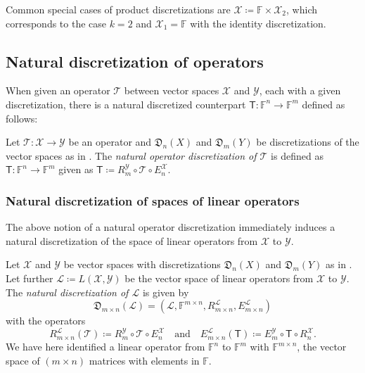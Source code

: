 \documentclass[a4paper]{paper}
\newcommand*{\SPC}[1]{{\ensuremath{\mathscr{#1}}}}
\newcommand*{\SPCL}{\SPC{L}}
\newcommand*{\SPCX}{\SPC{X}}
\newcommand*{\SPCY}{\SPC{Y}}
\newcommand*{\LINOP}[2]{{L(#1, #2)}}
\newcommand{\FIELD}{{\ensuremath{\mathbb{F}}}}
\newcommand*{\Fn}{{\ensuremath{\FIELD^n}}}
\newcommand*{\Fm}{{\ensuremath{\FIELD^m}}}
\newcommand*{\Fmxn}{{\ensuremath{\FIELD^{m \times n}}}}
\newcommand*{\OP}[1]{{\ensuremath{\mathcal{#1}}}}
\newcommand*{\OPT}{\OP{T}}
\newcommand{\DISCOP}[1]{{\ensuremath{\mathsf{#1}}}}
\newcommand*{\DISCOPT}{\DISCOP{T}}
\newcommand*{\EXT}[2]{\ensuremath{E_{#1}^{#2}}}
\newcommand*{\REST}[2]{\ensuremath{R_{#1}^{#2}}}
\newcommand*{\RnX}{{\ensuremath{\REST{n}{\SPC{X}}}}}
\newcommand*{\RmY}{{\ensuremath{\REST{m}{\SPC{Y}}}}}
\newcommand*{\EnX}{{\ensuremath{\EXT{n}{\SPC{X}}}}}
\newcommand*{\EmY}{{\ensuremath{\EXT{m}{\SPC{Y}}}}}
\newcommand*{\DISCR}[2]{{\ensuremath{\mathfrak{D}_{#2}(#1)}}}
\newcommand*{\DISCRnX}{\DISCR{X}{n}}
\newcommand*{\DISCRmY}{\DISCR{Y}{m}}
\begin{document}
%
Common special cases of product discretizations are $\SPCX\coloneqq \FIELD \times \SPCX_2$, which corresponds to the 
case 
$k=2$ and $\SPCX_1=\FIELD$ with the identity discretization.



\subsection{Natural discretization of operators}
\label{subsec:discr:operator}

When given an operator $\OPT$ between vector spaces $\SPCX$ and $\SPCY$, each with a given discretization, 
there is a natural discretized counterpart $\DISCOPT \colon \Fn \to \Fm$ defined as follows:

\begin{definition}
 \label{def:discr:operator:operator_discr}
 Let $\OPT\colon \SPCX \to \SPCY$ be an operator and $\DISCRnX$ and $\DISCRmY$ be 
 discretizations of the vector spaces as in . The 
 \emph{natural operator discretization of $\OPT$} is defined as $\DISCOPT \colon \Fn \to \Fm$ given as 
 $\DISCOPT \coloneqq  \RmY \circ \OPT \circ \EnX$.
\end{definition}


\subsubsection{Natural discretization of spaces of linear operators}
\label{subsubsec:discr:operator:linop_space}

The above notion of a natural operator discretization immediately induces a natural discretization of the space of 
linear operators from $\SPCX$ to $\SPCY$.

\begin{definition}
 \label{def:discr:operator:linop_space:linop_space_discr}
 Let $\SPCX$ and $\SPCY$ be vector spaces with discretizations $\DISCRnX$ and $\DISCRmY$ 
 as in . Let further $\SPCL \coloneqq  \LINOP{\SPCX}{\SPCY}$ be the 
 vector space of linear operators from $\SPCX$ to $\SPCY$. The \emph{natural discretization of $\SPCL$} is 
 given by
 \begin{equation*}
  \DISCR{\SPCL}{m\times n} = \left( \SPCL, \Fmxn, \REST{m\times n}{\SPCL}, \EXT{m\times n}{\SPCL}
  \right)
 \end{equation*}
 with the operators
 \begin{equation*}
  \REST{m\times n}{\SPCL}(\OPT) \coloneqq  \RmY \circ \OPT \circ \EnX
  \quad\text{and}\quad
  \EXT{m\times n}{\SPCL}(\DISCOPT) \coloneqq  \EmY \circ \DISCOPT \circ \RnX.
 \end{equation*}
 We have here identified a linear operator from $\Fn$ to $\Fm$ with $\Fmxn$, the vector space 
 of $(m \times n)$ matrices with elements in $\FIELD$.
\end{definition}
\end{document}
